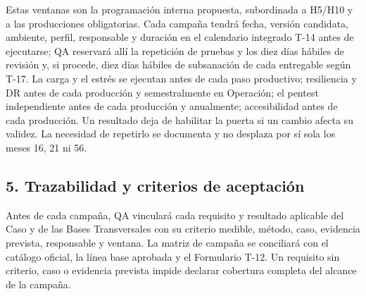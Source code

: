 \documentclass[11pt]{article}
\begin{document}
Estas ventanas son la programación interna propuesta, subordinada a H5/H10 y a las producciones obligatorias. Cada campaña tendrá fecha, versión candidata, ambiente, perfil, responsable y duración en el calendario integrado T-14 antes de ejecutarse; QA reservará allí la repetición de pruebas y los diez días hábiles de revisión y, si procede, diez días hábiles de subsanación de cada entregable según T-17. La carga y el estrés se ejecutan antes de cada paso productivo; resiliencia y DR antes de cada producción y semestralmente en Operación; el pentest independiente antes de cada producción y anualmente; accesibilidad antes de cada producción. Un resultado deja de habilitar la puerta si un cambio afecta su validez. La necesidad de repetirlo se documenta y no desplaza por sí sola los meses 16, 21 ni 56.

\subsection{5. Trazabilidad y criterios de aceptación}\label{t13-trazabilidad-y-criterios-de-aceptaciuxf3n}

Antes de cada campaña, QA vinculará cada requisito y resultado aplicable del Caso y de las Bases Transversales con su criterio medible, método, caso, evidencia prevista, responsable y ventana. La matriz de campaña se conciliará con el catálogo oficial, la línea base aprobada y el Formulario T-12. Un requisito sin criterio, caso o evidencia prevista impide declarar cobertura completa del alcance de la campaña.
\end{document}
